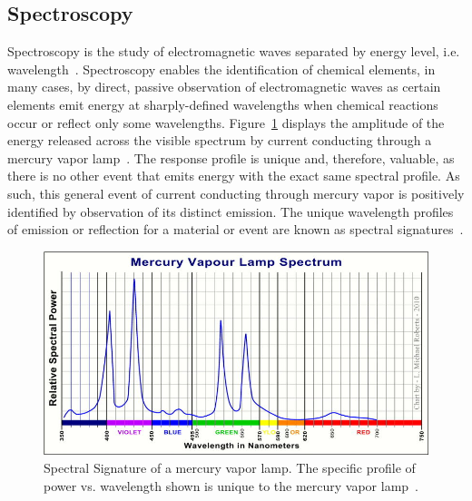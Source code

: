 \subsection{Spectroscopy}
Spectroscopy is the study of electromagnetic waves separated by energy level, i.e. wavelength~\cite{Kulesa}. Spectroscopy enables the identification of chemical elements, in many cases, by direct, passive observation of electromagnetic waves as certain elements emit energy at sharply-defined wavelengths when chemical reactions occur or reflect only some wavelengths. Figure~\ref{fig:HgLampSpectrum} displays the amplitude of the energy released across the visible spectrum by current conducting through a mercury vapor lamp~\cite{Roberts}. The response profile is unique and, therefore, valuable, as there is no other event that emits energy with the exact same spectral profile. As such, this general event of current conducting through mercury vapor is positively identified by observation of its distinct emission. The unique wavelength profiles of emission or reflection for a material or event are known as spectral signatures~\cite{SpectralSignatures}.

\begin{figure}[htb]		%
\centering
\includegraphics[width=.9\textwidth,trim=.1cm .1cm 2cm 1cm,clip]{images/chap1/HgLampSpectrum}
\caption{Spectral Signature of a mercury vapor lamp. The specific profile of power vs. wavelength shown is unique to the mercury vapor lamp~\cite{Roberts}.}
\label{fig:HgLampSpectrum}
\end{figure}

